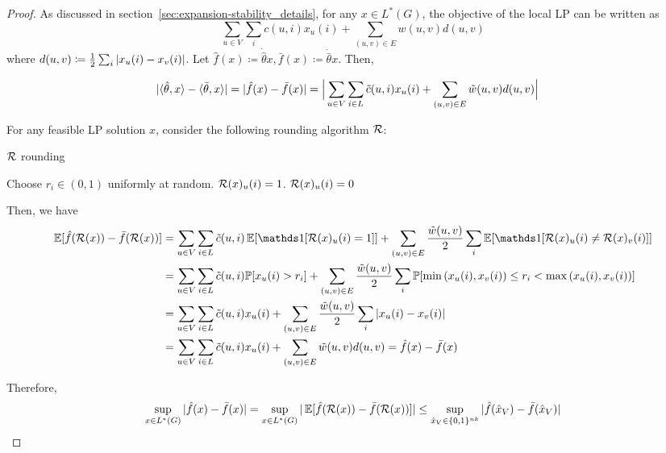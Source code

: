 \begin{proof}
As discussed in section~\ref{sec:expansion-stability_details}, for any $x \in L^*(G)$, the objective of the local LP can be written as \[\sum_{u\in V}\sum_i c(u,i)x_u(i) + \sum_{(u,v) \in E}w(u,v)d(u,v)\]
where $d(u,v) \coloneqq \frac{1}{2}\sum_{i}|x_u(i) - x_v(i)|$. Let $\hat f(x) \coloneqq \dot{\hat{\theta}}{x}, \bar{f}(x) \coloneqq \dot{\bar{\theta}}{x}$. Then,

\begin{align*}
|\langle \hat{\theta},x\rangle  - \langle \bar{\theta},x\rangle| &= |\hat{f}(x) - \bar{f}(x)| = \Big|\sum_{u \in V} \sum_{i\in L} \tilde{c}(u,i) x_u(i) + \sum_{(u,v) \in E} \tilde{w}(u,v)d(u,v)\Big|
\end{align*}

For any feasible LP solution $x$, consider the following rounding algorithm $\mathcal{R}$: 

\begin{algorithm}[H]
   \caption{$\mathcal{R}$ rounding}
   \label{alg:R_rounding}
\begin{algorithmic}[1]
        \STATE Choose $r_i \in (0,1)$ uniformly at random.
                \STATE $\mathcal{R}(x)_u(i) = 1$.
            \ELSE
                \STATE $\mathcal{R}(x)_u(i) = 0$
            \ENDIF 
        \ENDFOR
    \ENDFOR
\end{algorithmic}
\end{algorithm}

Then, we have
\begin{align*}
\E[\hat f(\calR(x)) - \bar{f}(\calR(x))] &= \sum_{u \in V} \sum_{i\in L} \tc(u,i) \E[\indicator[\calR(x)_u(i) = 1]] + \sum_{(u,v) \in E} \frac{\tw(u,v)}{2}\sum_{i} \E[\indicator[\calR(x)_u(i) \neq \calR(x)_v(i)]]
\\&= \sum_{u \in V} \sum_{i\in L} \tc(u,i) \Pr[x_u(i) > r_i] + \sum_{(u,v) \in E} \frac{\tw(u,v)}{2}\sum_{i} \Pr[\min\rbr{x_u(i), x_v(i)} \leq r_i < \max\rbr{x_u(i),x_v(i)}]
\\&= \sum_{u \in V} \sum_{i\in L} \tc(u,i) x_u(i) + \sum_{(u,v) \in E} \frac{\tw(u,v)}{2}\sum_{i} \abs{x_u(i) - x_v(i)}
\\&= \sum_{u \in V} \sum_{i\in L} \tc(u,i) x_u(i) + \sum_{(u,v) \in E} \tw(u,v)d(u,v) = \hat f(x) - \bar{f}(x) 
\end{align*}

Therefore,
\[\sup_{x \in L^*(G)}|\hat f(x) - \bar{f}(x)| = \sup_{x \in L^*(G)} |\operatorname*{\mathbb{E}}[\hat f(\mathcal{R}(x)) - \bar{f}(\mathcal{R}(x))] | \leq \sup_{\hat x_V \in \{0,1\}^{nk}} |\hat{f}(\hat x_V) - \bar{f}(\hat x_V)|\]


\end{proof}
